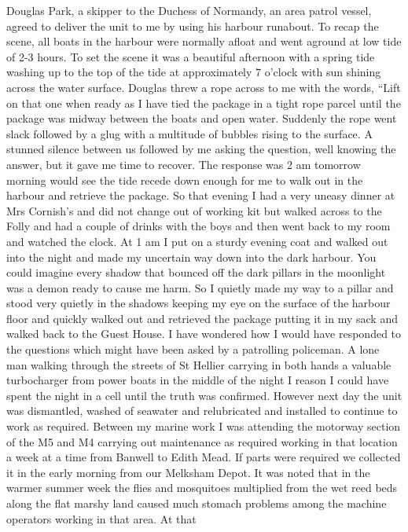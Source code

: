 Douglas Park, a skipper to the Duchess of Normandy, an area patrol vessel,
agreed to deliver the unit to me by using his harbour runabout. To recap the
scene, all boats in the harbour were normally afloat and went aground at low
tide of 2-3 hours.  To set the scene it was a beautiful afternoon with a spring
tide washing up to the top of the tide at approximately 7 o'clock with sun
shining across the water surface. Douglas threw a rope across to me with the
words, ``Lift on that one when ready as I have tied the package in a tight rope
parcel until the package was midway between the boats and open water.  Suddenly
the rope went slack followed by a glug with a multitude of bubbles rising to
the surface.  A stunned silence between us followed by me asking the question,
well knowing the answer, but it gave me time to recover.  The response was 2 am
tomorrow morning would see the tide recede down enough for me to walk out in
the harbour and retrieve the package.  So that evening I had a very uneasy
dinner at Mrs Cornish's and did not change out of working kit but walked across
to the Folly and had a couple of drinks with the boys and then went back to my
room and watched the clock.  At 1 am I put on a sturdy evening coat and walked
out into the night and made my uncertain way down into the dark harbour.  You
could imagine every shadow that bounced off the dark pillars in the moonlight
was a demon ready to cause me harm.  So I quietly made my way to a pillar and
stood very quietly in the shadows keeping my eye on the surface of the harbour
floor and quickly walked out and retrieved the package putting it in my sack
and walked back to the Guest House.  I have wondered how I would have responded
to the questions which might have been asked by a patrolling policeman.  A lone
man walking through the streets of St Hellier carrying in both hands a valuable
turbocharger from power boats in the middle of the night I reason I could have
spent the night in a cell until the truth was confirmed.  However next day the
unit was dismantled, washed of seawater and relubricated and installed to
continue                       to work as required. Between my marine work I
was attending the motorway section of the M5 and M4 carrying out maintenance as
required working in that location a week at a time from Banwell to Edith Mead.
If parts were required we collected it in the early morning from our Melksham
Depot. It was noted that in the warmer summer week the flies and mosquitoes
multiplied from the wet reed beds along the flat marshy land caused much
stomach problems among the machine operators working in that area.  At that

